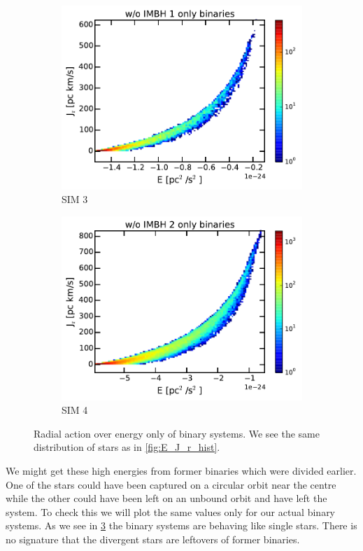 \begin{figure}[htbp]
\begin{subfigure}{0.475\textwidth}
		\includegraphics[width=\textwidth]{Plots/E_J_r_hist_bins_noIMBH1.pdf}
		\caption{SIM 3}
		\label{fig:E_J_r_hist_bins_noIMBH1}
	\end{subfigure}
	\hfill
	\begin{subfigure}{0.475\textwidth}
		\includegraphics[width=\textwidth]{Plots/E_J_r_hist_bins_noIMBH2.pdf}
		\caption{SIM 4}
		\label{fig:E_J_r_hist_bins_noIMBH2}
	\end{subfigure}
	\caption{Radial action over energy only of binary systems. We see the same distribution of stars as in \ref{fig:E_J_r_hist}.}
	\label{fig:E_J_r_bins_hist}
\end{figure}

\par We might get these high energies from former binaries which were divided earlier. One of the stars could have been captured on a circular orbit near the centre while the other could have been left on an unbound orbit and have left the system. To check this we will plot the same values only for our actual binary systems. As we see in \ref{fig:E_J_r_bins_hist} the binary systems are behaving like single stars. There is no signature that the divergent stars are leftovers of former binaries. 


